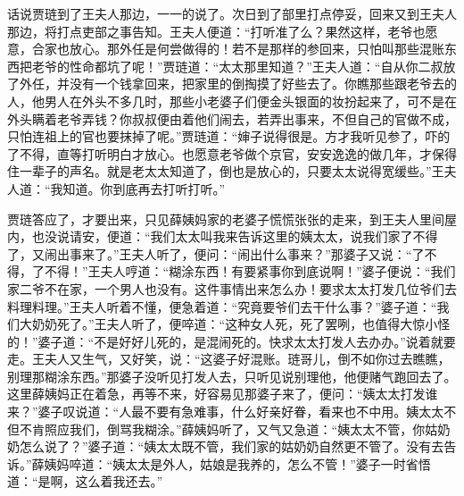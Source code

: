 


\begin{parag}
    话说贾琏到了王夫人那边，一一的说了。次日到了部里打点停妥，回来又到王夫人那边，将打点吏部之事告知。王夫人便道：“打听准了么？果然这样，老爷也愿意，合家也放心。那外任是何尝做得的！若不是那样的参回来，只怕叫那些混账东西把老爷的性命都坑了呢！”贾琏道：“太太那里知道？”王夫人道：“自从你二叔放了外任，并没有一个钱拿回来，把家里的倒掏摸了好些去了。你瞧那些跟老爷去的人，他男人在外头不多几时，那些小老婆子们便金头银面的妆扮起来了，可不是在外头瞒着老爷弄钱？你叔叔便由着他们闹去，若弄出事来，不但自己的官做不成，只怕连祖上的官也要抹掉了呢。”贾琏道：“婶子说得很是。方才我听见参了，吓的了不得，直等打听明白才放心。也愿意老爷做个京官，安安逸逸的做几年，才保得住一辈子的声名。就是老太太知道了，倒也是放心的，只要太太说得宽缓些。”王夫人道：“我知道。你到底再去打听打听。”
\end{parag}


\begin{parag}
    贾琏答应了，才要出来，只见薛姨妈家的老婆子慌慌张张的走来，到王夫人里间屋内，也没说请安，便道：“我们太太叫我来告诉这里的姨太太，说我们家了不得了，又闹出事来了。”王夫人听了，便问：“闹出什么事来？”那婆子又说：“了不得，了不得！”王夫人哼道：“糊涂东西！有要紧事你到底说啊！”婆子便说：“我们家二爷不在家，一个男人也没有。这件事情出来怎么办！要求太太打发几位爷们去料理料理。”王夫人听着不懂，便急着道：“究竟要爷们去干什么事？”婆子道：“我们大奶奶死了。”王夫人听了，便啐道：“这种女人死，死了罢咧，也值得大惊小怪的！”婆子道：“不是好好儿死的，是混闹死的。快求太太打发人去办办。”说着就要走。王夫人又生气，又好笑，说：“这婆子好混账。琏哥儿，倒不如你过去瞧瞧，别理那糊涂东西。”那婆子没听见打发人去，只听见说别理他，他便赌气跑回去了。这里薛姨妈正在着急，再等不来，好容易见那婆子来了，便问：“姨太太打发谁来？”婆子叹说道：“人最不要有急难事，什么好亲好眷，看来也不中用。姨太太不但不肯照应我们，倒骂我糊涂。”薛姨妈听了，又气又急道：“姨太太不管，你姑奶奶怎么说了？”婆子道：“姨太太既不管，我们家的姑奶奶自然更不管了。没有去告诉。”薛姨妈啐道：“姨太太是外人，姑娘是我养的，怎么不管！”婆子一时省悟道：“是啊，这么着我还去。”
\end{parag}


